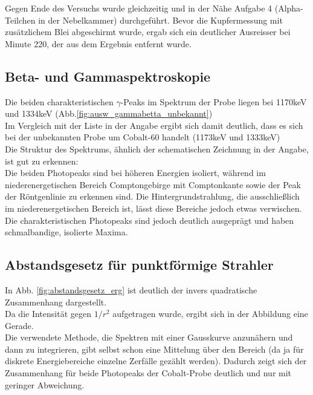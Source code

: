 \documentclass[12pt,a4paper]{article}
\begin{document}
\begin{multicols}{2}
\noindent Gegen Ende des Versuchs wurde gleichzeitig und in der Nähe Aufgabe 4 (Alpha-Teilchen in der Nebelkammer) durchgeführt. Bevor die Kupfermessung mit zusätzlichem Blei abgeschirmt wurde, ergab sich ein deutlicher Ausreisser bei Minute 220, der aus dem Ergebnis entfernt wurde.

\subsection{Beta- und Gammaspektroskopie}

Die beiden charakteristischen $\gamma$-Peaks im Spektrum der Probe liegen bei 1170keV und 1334keV (Abb.\ref{fig:ausw_gammabetta_unbekannt})\\
Im Vergleich mit der Liste in der Angabe ergibt sich damit deutlich, dass es sich bei der unbekannten Probe um Cobalt-60 handelt (1173keV und 1333keV)\\

\noindent Die Struktur des Spektrums, ähnlich der schematischen Zeichnung in der Angabe, ist gut zu erkennen:\\
Die beiden Photopeaks sind bei höheren Energien isoliert, während im niederenergetischen Bereich Comptongebirge mit Comptonkante sowie der Peak der Röntgenlinie zu erkennen sind. Die Hintergrundstrahlung, die ausschließlich im niederenergetischen Bereich ist, lässt diese Bereiche jedoch etwas verwischen.\\

\noindent Die charakteristischen Photopeaks sind jedoch deutlich ausgeprägt und haben schmalbandige, isolierte Maxima.

\subsection{Abstandsgesetz für punktförmige Strahler}

In Abb. \ref{fig:abstandsgesetz_erg} ist deutlich der invers quadratische Zusammenhang dargestellt.\\
Da die Intensität gegen $1/r^2$ aufgetragen wurde, ergibt sich in der Abbildung eine Gerade.\\

\noindent Die verwendete Methode, die Spektren mit einer Gausskurve anzunähern und dann zu integrieren, gibt selbst schon eine Mittelung über den Bereich (da ja für diskrete Energiebereiche einzelne Zerfälle gezählt werden). Dadurch zeigt sich der Zusammenhang für beide Photopeaks der Cobalt-Probe deutlich und nur mit geringer Abweichung.


\end{multicols}
\end{document}
